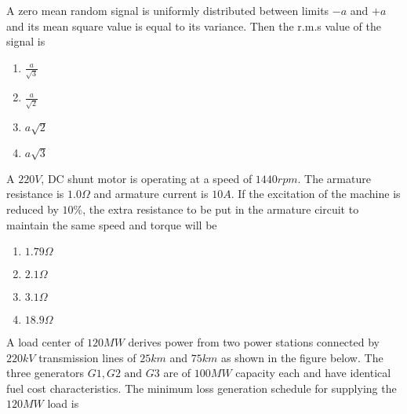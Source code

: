 \item A zero mean random signal is uniformly distributed between limits $-a$ and $+a$ and its mean square value is equal to its variance. Then the r.m.s value of the signal is
\begin{multicols}{4}
\begin{enumerate}
\item $\frac{a}{\sqrt{3}}$
\item  $\frac{a}{\sqrt{2}}$
\item  $a\sqrt{2}$
\item $a\sqrt{3}$
\end{enumerate}
\end{multicols}

\item A $220 V$, DC shunt motor is operating at a speed of $1440 rpm$. The armature resistance is $1.0 \Omega$ and armature current is $10 A$. If the excitation of the machine is reduced by $10 \%$, the extra resistance to be put in the armature circuit to maintain the same speed and torque will be
\begin{multicols}{4}
\begin{enumerate}
\item $1.79 \Omega$
\item  $2.1 \Omega$
\item  $3.1 \Omega$
\item $18.9 \Omega$
\end{enumerate}
\end{multicols}

\item A load center of $120 MW$ derives power from two power stations connected by $220 kV$ transmission lines of $25 km$ and $75 km$ as shown in the figure below. The three generators $G1, G2 \text{ and } G3$ are of $100 MW$ capacity each and have identical fuel cost characteristics. The minimum loss generation schedule for supplying the $120 MW$ load is

